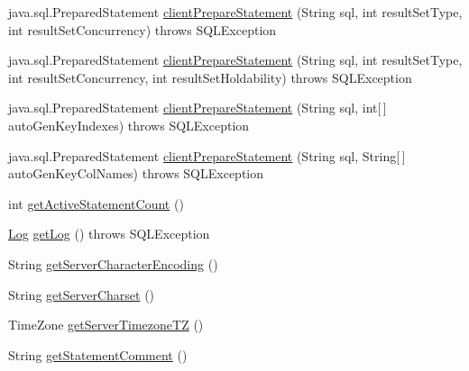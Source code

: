 \begin{DoxyCompactItemize}
\item 
java.\+sql.\+Prepared\+Statement \mbox{\hyperlink{classcom_1_1mysql_1_1jdbc_1_1jdbc2_1_1optional_1_1_connection_wrapper_ad71fc526adef4d300477c03514b998c2}{client\+Prepare\+Statement}} (String sql, int result\+Set\+Type, int result\+Set\+Concurrency)  throws S\+Q\+L\+Exception 
\item 
java.\+sql.\+Prepared\+Statement \mbox{\hyperlink{classcom_1_1mysql_1_1jdbc_1_1jdbc2_1_1optional_1_1_connection_wrapper_a546e049a9b2f6741d15e1e1bdbe31292}{client\+Prepare\+Statement}} (String sql, int result\+Set\+Type, int result\+Set\+Concurrency, int result\+Set\+Holdability)  throws S\+Q\+L\+Exception 
\item 
java.\+sql.\+Prepared\+Statement \mbox{\hyperlink{classcom_1_1mysql_1_1jdbc_1_1jdbc2_1_1optional_1_1_connection_wrapper_a2553dc69e9e6f8026ed0bf4911a9e417}{client\+Prepare\+Statement}} (String sql, int\mbox{[}$\,$\mbox{]} auto\+Gen\+Key\+Indexes)  throws S\+Q\+L\+Exception 
\item 
java.\+sql.\+Prepared\+Statement \mbox{\hyperlink{classcom_1_1mysql_1_1jdbc_1_1jdbc2_1_1optional_1_1_connection_wrapper_a7d857e3e39f13e33451b0f491adbd573}{client\+Prepare\+Statement}} (String sql, String\mbox{[}$\,$\mbox{]} auto\+Gen\+Key\+Col\+Names)  throws S\+Q\+L\+Exception 
\item 
int \mbox{\hyperlink{classcom_1_1mysql_1_1jdbc_1_1jdbc2_1_1optional_1_1_connection_wrapper_a72b79457a247fb0cedc5437e3d0d4cf2}{get\+Active\+Statement\+Count}} ()
\item 
\mbox{\hyperlink{interfacecom_1_1mysql_1_1jdbc_1_1log_1_1_log}{Log}} \mbox{\hyperlink{classcom_1_1mysql_1_1jdbc_1_1jdbc2_1_1optional_1_1_connection_wrapper_ab6845a61a447081e344ae983d1f424da}{get\+Log}} ()  throws S\+Q\+L\+Exception 
\item 
String \mbox{\hyperlink{classcom_1_1mysql_1_1jdbc_1_1jdbc2_1_1optional_1_1_connection_wrapper_a2426ec0276a9fe98270a545d0c272546}{get\+Server\+Character\+Encoding}} ()
\item 
String \mbox{\hyperlink{classcom_1_1mysql_1_1jdbc_1_1jdbc2_1_1optional_1_1_connection_wrapper_a1ef2f18c2e33a44c97b764a50fda2da4}{get\+Server\+Charset}} ()
\item 
Time\+Zone \mbox{\hyperlink{classcom_1_1mysql_1_1jdbc_1_1jdbc2_1_1optional_1_1_connection_wrapper_a2c40120ec4b0435a9e26955ee5d82c0d}{get\+Server\+Timezone\+TZ}} ()
\item 
String \mbox{\hyperlink{classcom_1_1mysql_1_1jdbc_1_1jdbc2_1_1optional_1_1_connection_wrapper_a14a98d8f5aed8168fbb25a76210e9878}{get\+Statement\+Comment}} ()

\end{DoxyCompactItemize}

